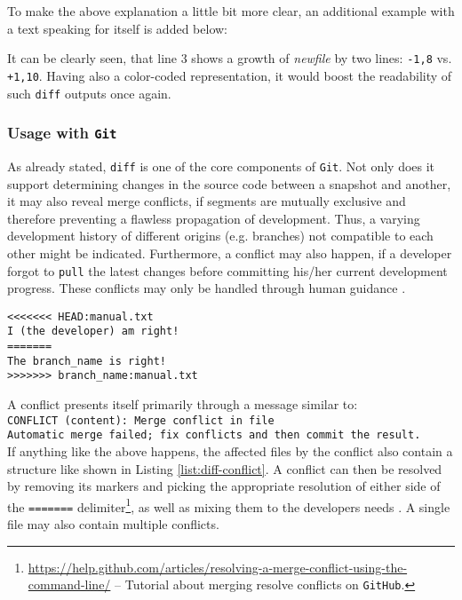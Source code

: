 To make the above explanation a little bit more clear, an additional example with a text speaking for itself is added below:



It can be clearly seen, that line 3 shows a growth of \emph{newfile} by two lines: \texttt{-1,8} vs. \texttt{+1,10}. Having also a color-coded representation, it would boost the readability of such \texttt{diff} outputs once again.


\subsubsection{Usage with \texttt{Git}}
As already stated, \texttt{diff} is one of the core components of \texttt{Git}. Not only does it support determining changes in the source code between a snapshot and another, it may also reveal merge conflicts, if segments are mutually exclusive and therefore preventing a flawless propagation of development. Thus, a varying development history of different origins (e.g. branches) not compatible to each other might be indicated. Furthermore, a conflict may also happen, if a developer forgot to \texttt{pull} the latest changes before committing his/her current development progress. These conflicts may only be handled through human guidance \cite[124]{loeliger2012version}.

\begin{lstlisting}[label={list:diff-conflict}, caption={A snippet of a file called ``manual.txt'', which is affected by a conflict. Content between \texttt{HEAD} and \texttt{=======} contains the local version, content below contains the foreign conflicting version.}]
<<<<<<< HEAD:manual.txt
I (the developer) am right!
=======
The branch_name is right!
>>>>>>> branch_name:manual.txt
\end{lstlisting}

A conflict presents itself primarily through a message similar to:\\
\texttt{CONFLICT (content): Merge conflict in file\\
Automatic merge failed; fix conflicts and then commit the result.}\\
If anything like the above happens, the affected files by the conflict also contain a structure like shown in Listing \ref{list:diff-conflict}. A conflict can then be resolved by removing its markers and picking the appropriate resolution of either side of the \texttt{=======} delimiter\footnote{\url{https://help.github.com/articles/resolving-a-merge-conflict-using-the-command-line/} -- Tutorial about merging resolve conflicts on \texttt{GitHub}.}, as well as mixing them to the developers needs \cite[126]{loeliger2012version}. A single file may also contain multiple conflicts.

